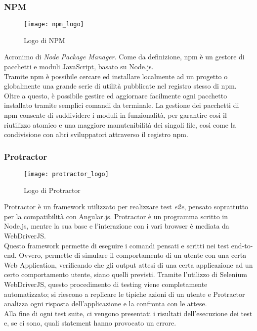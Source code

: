 \subsubsection{NPM}
\begin{figure}[htb] 
    \centering 
    \texttt{[image: npm\_logo]} 
    \caption{Logo di NPM}
\end{figure}
Acronimo di \emph{Node Package Manager}. Come da definizione, npm è un gestore di pacchetti e moduli JavaScript, basato su Node.js.\\ 
Tramite npm è possibile cercare ed installare localmente ad un progetto o globalmente una grande serie di utilità pubblicate nel registro stesso di \gls{npm}. Oltre a questo, è possibile gestire ed aggiornare facilmente ogni pacchetto installato tramite semplici comandi da terminale.
La gestione dei pacchetti di npm consente di suddividere i moduli in funzionalità, per garantire così il riutilizzo atomico e una maggiore manutenibilità dei singoli file, così come la condivisione con altri sviluppatori attraverso il registro \gls{npm}. 

\subsubsection{Protractor}
\begin{figure}[htb] 
    \centering 
    \texttt{[image: protractor\_logo]} 
    \caption{Logo di Protractor}
\end{figure}
Protractor è un framework utilizzato per realizzare test \emph{e2e}, pensato soprattutto per la compatibilità con Angular.js. Protractor è un programma scritto in Node.js, mentre la sua base e l’interazione con i vari browser è mediata da WebDriverJS.\\
Questo framework permette di eseguire i comandi pensati e scritti nei test end-to-end. Ovvero, permette di simulare il comportamento di un utente con una certa Web Application, verificando che gli output attesi di una certa applicazione ad un certo comportamento utente, siano quelli previsti. Tramite l’utilizzo di Selenium WebDriverJS, questo procedimento di testing viene completamente automatizzato; si riescono a replicare le tipiche azioni di un utente e Protractor analizza ogni risposta dell’applicazione e la confronta con le attese.\\
Alla fine di ogni test suite, ci vengono presentati i risultati dell’esecuzione dei test e, se ci sono, quali statement hanno provocato un errore.

